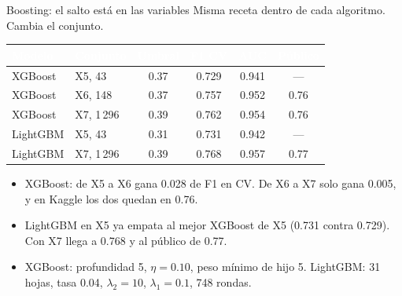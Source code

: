 \documentclass[aspectratio=169,10pt]{beamer}
\newcommand{\mejor}{\rowcolor{uniandesYellow}}
\newcommand{\fila}{\rowcolor{rowAlt}}
\newcommand{\hh}[1]{\cellcolor{uniandesInk}\textcolor{white}{\textbf{#1}}}
\begin{document}
\begin{frame}{Boosting: el salto está en las variables}
  Misma receta dentro de cada algoritmo. Cambia el conjunto.
  \vspace{0.35em}
  \footnotesize
  \begin{center}
  \begin{tabular}{@{}llcccc@{}}
    \toprule
    \hh{Modelo} & \hh{Conjunto} & \hh{Umbral} & \hh{F1 CV} & \hh{AUC} & \hh{Público} \\
    \midrule
    XGBoost & X5, 43 & 0.37 & 0.729 & 0.941 & --- \\
    \fila XGBoost & X6, 148 & 0.37 & 0.757 & 0.952 & 0.76 \\
    XGBoost & X7, 1\,296 & 0.39 & 0.762 & 0.954 & 0.76 \\
    \fila LightGBM & X5, 43 & 0.31 & 0.731 & 0.942 & --- \\
    \mejor LightGBM & X7, 1\,296 & 0.39 & 0.768 & 0.957 & 0.77 \\
    \bottomrule
  \end{tabular}
  \end{center}
  \vspace{0.2em}
  \begin{itemize}
    \setlength{\itemsep}{0.2em}
    \item XGBoost: de X5 a X6 gana 0.028 de F1 en CV. De X6 a X7 solo gana 0.005, y en Kaggle los dos quedan en 0.76.
    \item LightGBM en X5 ya empata al mejor XGBoost de X5 (0.731 contra 0.729). Con X7 llega a 0.768 y al público de 0.77.
    \item XGBoost: profundidad 5, $\eta=0.10$, peso mínimo de hijo 5. LightGBM: 31 hojas, tasa 0.04, $\lambda_2=10$, $\lambda_1=0.1$, 748 rondas.
  \end{itemize}
\end{frame}
\end{document}
